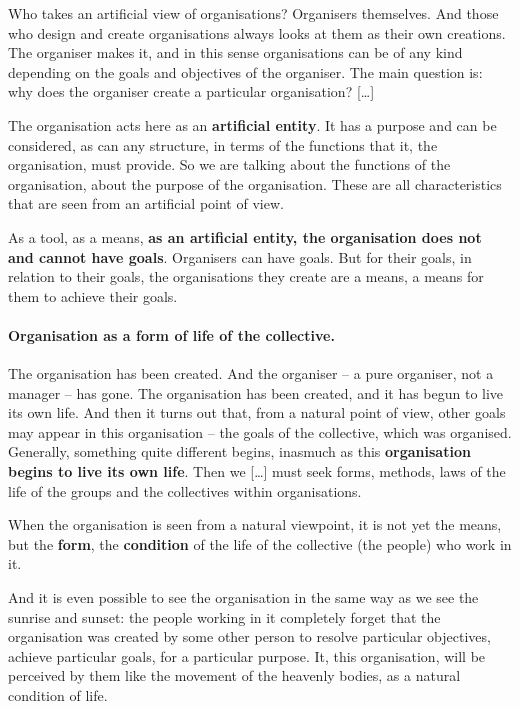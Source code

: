 \documentclass[11pt,a4paper]{article}
\begin{document}
Who takes an artificial view of organisations? Organisers themselves. And
those who design and create organisations always looks at them as their own
creations.  The organiser makes it, and in this sense organisations can be of
any kind depending on the goals and objectives of the organiser. The main
question is: why does the organiser create a particular organisation?
[\ldots]

The organisation acts here as an \textbf{artificial entity}. It has a purpose
and can be considered, as can any structure, in terms of the functions that
it, the organisation, must provide. So we are talking about the functions of
the organisation, about the purpose of the organisation.  These are all
characteristics that are seen from an artificial point of view.

As a tool, as a means, \textbf{as an artificial entity, the organisation does
  not and cannot have goals}. Organisers can have goals. But for their goals,
in relation to their goals, the organisations they create are a means, a means
for them to achieve their goals.

\paragraph{Organisation as a form of life of the collective.}
The organisation has been created. And the organiser – a pure organiser, not a
manager – has gone. The organisation has been created, and it has begun to
live its own life. And then it turns out that, from a natural point of view,
other goals may appear in this organisation – the goals of the collective,
which was organised. Generally, something quite different begins, inasmuch as
this \textbf{organisation begins to live its own life}. Then we [\ldots] must
seek forms, methods, laws of the life of the groups and the collectives within
organisations.

When the organisation is seen from a natural viewpoint, it is not yet the
means, but the \textbf{form}, the \textbf{condition} of the life of the
collective (the people) who work in it.

And it is even possible to see the organisation in the same way as we see the
sunrise and sunset: the people working in it completely forget that the
organisation was created by some other person to resolve particular
objectives, achieve particular goals, for a particular purpose. It, this
organisation, will be perceived by them like the movement of the heavenly
bodies, as a natural condition of life.
\end{document}
